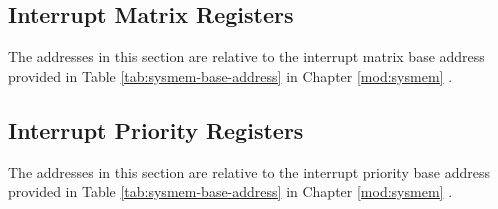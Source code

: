 \documentclass[main\_\_EN.tex]{subfiles}
\begin{document}
\subsection{Interrupt Matrix Registers}

The addresses in this section are relative to  the interrupt matrix base address provided in Table \ref{tab:sysmem-base-address} in Chapter \ref{mod:sysmem} \textit{}.



\subsection{Interrupt Priority Registers}
\label{sec:intpri-reg}

The addresses in this section are relative to  the interrupt priority base address provided in Table \ref{tab:sysmem-base-address} in Chapter \ref{mod:sysmem} \textit{}.


\end{document}
